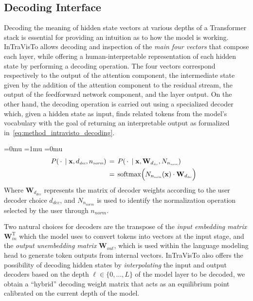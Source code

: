 \documentclass[11pt,a4paper,twocolumn]{article}
\newcommand{\gbm}[1]{\bm{\mathbf{#1}}} %
\renewcommand{\T}{\mathrm{T}} %
\begin{document}
\subsection{Decoding Interface}\label{ssec:intravisto_1}

Decoding the meaning of hidden state vectors at various depths of a Transformer stack is essential for providing an intuition as to how the model is working.
InTraVisTo allows decoding and inspection of the \emph{main four vectors} that compose each layer, while offering a human-interpretable representation of each hidden state by performing a decoding operation.
The four vectors correspond respectively to the output of the attention component, the intermediate state given by the addition of the attention component to the residual stream, the output of the feedforward network component, and the layer output.
On the other hand, the decoding operation is carried out using a specialized decoder which, given a hidden state as input, finds related tokens from the model's vocabulary with the goal of returning an interpretable output as formalized in~\cref{eq:method_intravisto_decoding}.

\vspace{-12pt}
{
\medmuskip=0mu
\thinmuskip=1mu
\thickmuskip=0mu
\scriptspace=0pt
\begin{equation}
\label{eq:method_intravisto_decoding}
\hspace{-10pt}
\begin{aligned}
P(\,\cdot\,\mid \gbm{x}, d_\textit{\scalebox{.8}{dec}}, n_\textit{\scalebox{.8}{norm}}) \,&=\, P(\,\cdot\,\mid \gbm{x}, \gbm{W}_{d_\textit{\scalebox{.8}{dec}}}, N_{n_\textit{\scalebox{.8}{norm}}}) \\
&=\,\operatorname{softmax}\Bigl(N_{n_\textit{\scalebox{.8}{norm}}}(\gbm{x}) \cdot \gbm{W}_{d_\textit{\scalebox{.8}{dec}}}\Bigr)
\end{aligned}
\end{equation}
}
Where $\gbm{W}_{d_\textit{dec}}$ represents the matrix of decoder weights according to the user decoder choice $d_\textit{dec}$, and $N_{n_\textit{norm}}$ is used to identify the normalization operation selected by the user through $n_\textit{norm}$.

Two natural choices for decoders are the transpose of the \emph{input embedding matrix} $\gbm{W}_\textit{in}^\T$ which the model uses to convert tokens into vectors at the input stage, and the \emph{output unembedding matrix} $\gbm{W}_\textit{out}$, which is used within the language modeling head to generate token outputs from internal vectors.
InTraVisTo also offers the possibility of decoding hidden states by \emph{interpolating} the input and output decoders based on the depth $\ell\in\{0,\ldots,L\}$ of the model layer to be decoded, we obtain a ``hybrid'' decoding weight matrix that acts as an equilibrium point calibrated on the current depth of the model.
\end{document}
